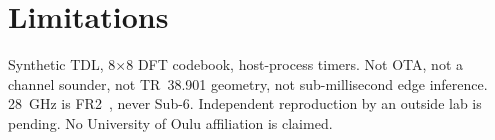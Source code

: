 \section{Limitations}
Synthetic TDL, 8$\times$8 DFT codebook, host-process timers.
Not OTA, not a channel sounder, not TR~38.901 geometry, not sub-millisecond edge inference.
28~GHz is FR2~\cite{3gpp_ts38101_2}, never Sub-6.
Independent reproduction by an outside lab is pending.
No University of Oulu affiliation is claimed.
